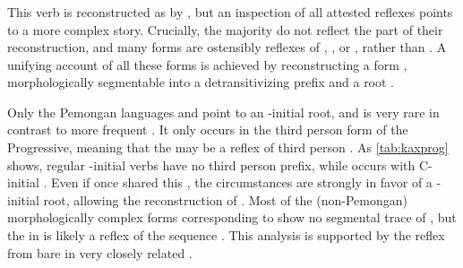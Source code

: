 
%

\subsubsection{ }
\label{sec:come}



This verb is reconstructed as  by \textcite[30]{gildea2007greenberg}, but an inspection of all attested reflexes  points to a more complex story.
Crucially, the majority do not reflect the  part of their reconstruction, and many forms are ostensibly reflexes of , , or , rather than .
A unifying account of all these forms is achieved by reconstructing a \PC form , morphologically segmentable into a detransitivizing prefix and a root .

Only the Pemongan languages and \kaxui point to an -initial root, and \kaxui {} is very rare in contrast to more frequent .
It only occurs in the third person form of the Progressive, meaning that the  may be a reflex of third person .
As \cref{tab:kaxprog} shows, regular -initial verbs have no third person prefix, while  occurs with C-initial  .
Even if  once shared this , the circumstances are strongly in favor of a -initial \kaxui root, allowing the reconstruction of \PC {}.
%
%
%
Most of the (non-Pemongan) morphologically complex forms corresponding to   show no segmental trace of , but the  in \akawaio {} is likely a reflex of the sequence .
This analysis is supported by the reflex  from bare  in very closely related \macushi.

